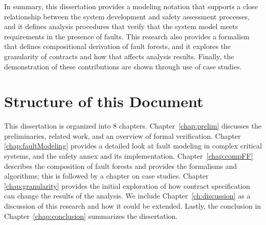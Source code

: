 In summary, this dissertation provides a modeling notation that supports a close relationship between the system development and safety assessment processes, and it defines analysis procedures that verify that the system model meets requirements in the presence of faults. This research also provides a formalism that defines compositional derivation of fault forests, and it explores the granularity of contracts and how that affects analysis results. Finally, the demonstration of these contributions are shown through use of case studies. 

\section{Structure of this Document}
This dissertation is organized into 8 chapters. Chapter~\ref{chap:prelim} discusses the preliminaries, related work, and an overview of formal verification. Chapter \ref{chap:faultModeling} provides a detailed look at fault modeling in complex critical systems, and the safety annex and its implementation. Chapter~\ref{chap:compFF} describes the composition of fault forests and provides the formalisms and algorithms; this is followed by a chapter on case studies. Chapter \ref{chap:granularity} provides the initial exploration of how contract specification can change the results of the analysis. We include Chapter~\ref{ch:discussion} as a discussion of this research and how it could be extended. Lastly, the conclusion in Chapter~\ref{chap:conclusion} summarizes the dissertation.











